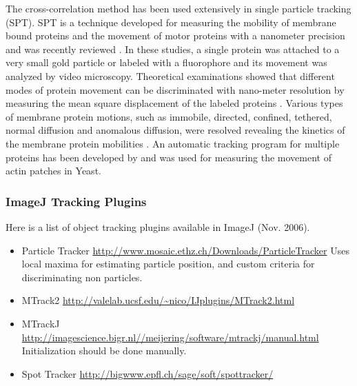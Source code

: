 The cross-correlation method has been used extensively in single
particle tracking (SPT). SPT is a technique developed for measuring the
mobility of membrane bound proteins and the movement of motor proteins
with a nanometer precision \citep{gellesNAT1988, Geerts1987, schnappCMOT1988, sheetzNAT1989} and was recently reviewed
\citep{ritchieME2003}. In these studies, a single protein was attached
to a very small gold particle or labeled with a fluorophore and its
movement was analyzed by video microscopy. Theoretical examinations
showed that different modes of protein movement can be discriminated
with nano-meter resolution by measuring the mean square displacement of
the labeled proteins \citep{qianBJ1991}. Various types of membrane
protein motions, such as immobile, directed, confined, tethered, normal
diffusion and anomalous diffusion, were resolved revealing the kinetics
of the membrane protein mobilities \citep{kusumiBJ1993, saxtonBJ1997}.
An automatic tracking program for multiple proteins has been developed
by \citet*{ghoshBJ1994} and was used for measuring the movement of actin patches in Yeast\citep{calssonBJ2002}. 


\subsubsection{ImageJ Tracking Plugins}

Here is a list of object tracking plugins available in ImageJ (Nov. 2006).

\begin{itemize}
\item Particle Tracker
\subitem \url{http://www.mosaic.ethz.ch/Downloads/ParticleTracker}
\subitem Uses local maxima for estimating particle position, and custom criteria
for discriminating non particles. 

\item MTrack2
\subitem \url{http://valelab.ucsf.edu/~nico/IJplugins/MTrack2.html}

\item MTrackJ
\subitem \url{http://imagescience.bigr.nl//meijering/software/mtrackj/manual.html}
\subitem Initialization should be done manually.

\item Spot Tracker
\subitem \url{http://bigwww.epfl.ch/sage/soft/spottracker/}
\end{itemize}


